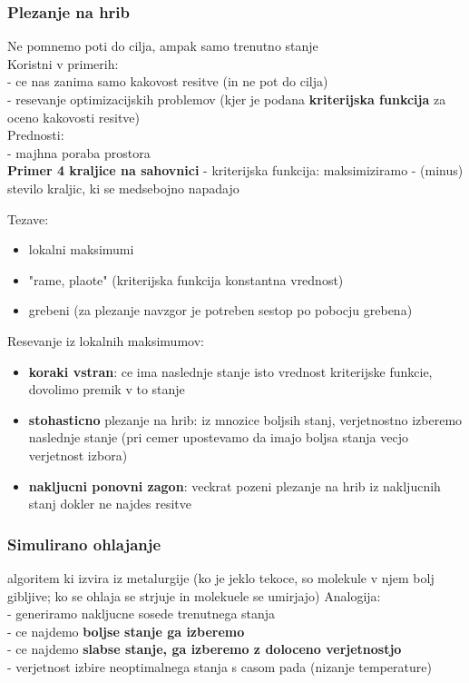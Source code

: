 \subsubsection{Plezanje na hrib}
Ne pomnemo poti do cilja, ampak samo trenutno stanje\\
Koristni v primerih:\\
- ce nas zanima samo kakovost resitve (in ne pot do cilja)\\
- resevanje optimizacijskih problemov (kjer je podana \textbf{kriterijska funkcija} za oceno kakovosti resitve)\\

Prednosti:\\
- majhna poraba prostora\\

\textbf{Primer 4 kraljice na sahovnici}
- kriterijska funkcija: maksimiziramo - (minus) stevilo kraljic, ki se medsebojno napadajo

Tezave:
\begin{itemize}[noitemsep,topsep=0pt,leftmargin=*]
    \item lokalni maksimumi
    \item "rame, plaote" (kriterijska funkcija konstantna vrednost)
    \item grebeni (za plezanje navzgor je potreben sestop po pobocju grebena)
\end{itemize}

Resevanje iz lokalnih maksimumov:
\begin{itemize}[noitemsep,topsep=0pt,leftmargin=*]
    \item \textbf{koraki vstran}: ce ima naslednje stanje isto vrednost kriterijske funkcie, dovolimo premik v to stanje
    \item \textbf{stohasticno} plezanje na hrib: iz mnozice boljsih stanj, verjetnostno izberemo naslednje stanje (pri cemer upostevamo da imajo boljsa stanja vecjo verjetnost izbora)
    \item \textbf{nakljucni ponovni zagon}: veckrat pozeni plezanje na hrib iz nakljucnih stanj dokler ne najdes resitve
\end{itemize}

\subsubsection{Simulirano ohlajanje}
algoritem ki izvira iz metalurgije (ko je jeklo tekoce, so molekule v njem bolj gibljive; ko se ohlaja se strjuje in molekuele se umirjajo)
Analogija:\\
- generiramo nakljucne sosede trenutnega stanja\\
- ce najdemo \textbf{boljse stanje ga izberemo}\\
- ce najdemo \textbf{slabse stanje, ga izberemo z doloceno verjetnostjo}\\
- verjetnost izbire neoptimalnega stanja s casom pada (nizanje temperature)

